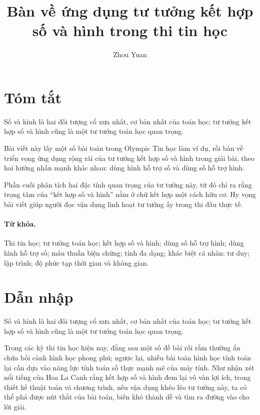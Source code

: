 \documentclass[11pt]{article}
\title{Bàn về ứng dụng tư tưởng kết hợp số và hình trong thi tin học}
\author{Zhou Yuan}
\date{}
\begin{document}
\maketitle


\section*{Tóm tắt}

Số và hình là hai đối tượng cổ xưa nhất, cơ bản nhất của toán học; tư tưởng
kết hợp số và hình cũng là một tư tưởng toán học quan trọng.

Bài viết này lấy một số bài toán trong Olympic Tin học làm ví dụ, rồi bàn về
triển vọng ứng dụng rộng rãi của tư tưởng kết hợp số và hình trong giải bài,
theo hai hướng nhấn mạnh khác nhau: dùng hình hỗ trợ số và dùng số hỗ trợ
hình.

Phần cuối phân tích hai đặc tính quan trọng của tư tưởng này, từ đó chỉ ra
rằng trọng tâm của ``kết hợp số và hình'' nằm ở chữ kết hợp một cách hữu cơ.
Hy vọng bài viết giúp người đọc vận dụng linh hoạt tư tưởng ấy trong thi đấu
thực tế.

\paragraph{Từ khóa.}
Thi tin học; tư tưởng toán học; kết hợp số và hình; dùng số hỗ trợ hình; dùng
hình hỗ trợ số; mâu thuẫn biện chứng; tính đa dạng; khác biệt cá nhân; tư
duy; lập trình; độ phức tạp thời gian và không gian.

\tableofcontents

\section{Dẫn nhập}

Số và hình là hai đối tượng cổ xưa nhất, cơ bản nhất của toán học; tư tưởng
kết hợp số và hình cũng là một tư tưởng toán học quan trọng.

Trong các kỳ thi tin học hiện nay, đằng sau một số đề bài rối rắm thường ẩn
chứa bối cảnh hình học phong phú; ngược lại, nhiều bài toán hình học tính
toán lại cần dựa vào năng lực tính toán số thực mạnh mẽ của máy tính. Như
nhận xét nổi tiếng của Hoa La Canh rằng kết hợp số và hình đem lại vô vàn
lợi ích, trong thiết kế thuật toán và chương trình, nếu vận dụng khéo léo tư
tưởng này, ta có thể phá được nút thắt của bài toán, biến khó thành dễ và tìm
ra đường vào cho lời giải.
\end{document}
